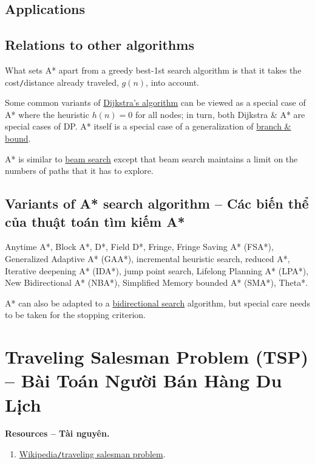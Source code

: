 \documentclass{article}
\begin{document}

\subsection{Applications}


\subsection{Relations to other algorithms}
What sets A* apart from a greedy best-1st search algorithm is that it takes the cost{\tt/}distance already traveled, $g(n)$, into account.

Some common variants of \href{https://en.wikipedia.org/wiki/Dijkstra%27s_algorithm}{Dijkstra's algorithm} can be viewed as a special case of A* where the heuristic $h(n) = 0$ for all nodes; in turn, both Dijkstra \& A* are special cases of DP. A* itself is a special case of a generalization of \href{https://en.wikipedia.org/wiki/Branch_and_bound}{branch \& bound}.

A* is similar to \href{https://en.wikipedia.org/wiki/Beam_search}{beam search} except that beam search maintains a limit on the numbers of paths that it has to explore.


\subsection{Variants of A* search algorithm -- Các biến thể của thuật toán tìm kiếm A*}
Anytime A*, Block A*, D*, Field D*, Fringe, Fringe Saving A* (FSA*), Generalized Adaptive A* (GAA*), incremental heuristic search, reduced A*, Iterative deepening A* (IDA*), jump point search, Lifelong Planning A* (LPA*), New Bidirectional A* (NBA*), Simplified Memory bounded A* (SMA*), Theta*.

A* can also be adapted to a \href{https://en.wikipedia.org/wiki/Bidirectional_search}{bidirectional search} algorithm, but special care needs to be taken for the stopping criterion.


\section{Traveling Salesman Problem (TSP) -- Bài Toán Người Bán Hàng Du Lịch}
\textbf{\textsf{Resources -- Tài nguyên.}}
\begin{enumerate}
    \item \href{https://en.wikipedia.org/wiki/Travelling_salesman_problem}{Wikipedia{\tt/}traveling salesman problem}.
\end{enumerate}
\end{document}
